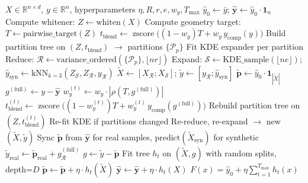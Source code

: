 \documentclass[11pt,a4paper]{article}
\newcommand{\R}{\mathbb{R}}
\newcommand{\zscore}{\operatorname{zscore}}
\theoremstyle{definition}
\begin{document}
\begin{algorithm}[H]
\caption{GeoXGB Fit (Regression, Squared Error)}
\begin{algorithmic}[1]
\REQUIRE $X \in \R^{n \times d}$, $y \in \R^n$, hyperparameters $\eta, R, r, e, w_y, T_{\max}$
\STATE $\hat{y}_0 \gets \bar{y}$; \quad $\hat{\bm{y}} \gets \hat{y}_0 \cdot \bm{1}_n$
\STATE Compute whitener: $Z \gets \text{whiten}(X)$
\STATE Compute geometry target: $T \gets \text{pairwise\_target}(Z)$
\STATE $t_{\text{blend}} \gets \zscore\bigl((1-w_y) T + w_y\, y_{\text{comp}}(y)\bigr)$
\STATE Build partition tree on $(Z, t_{\text{blend}})$ $\to$ partitions $\{\mathcal{P}_p\}$
\STATE Fit KDE expander per partition
\STATE Reduce: $\mathcal{R} \gets \text{variance\_ordered}(\{\mathcal{P}_p\}, \lfloor n r \rfloor)$
\STATE Expand: $\mathcal{S} \gets \text{KDE\_sample}(\lfloor n e \rfloor)$; \quad $\hat{y}_{\text{syn}} \gets \text{kNN}_{k=3}(Z_\mathcal{S}, Z_\mathcal{R}, y_\mathcal{R})$
\STATE $\tilde{X} \gets [X_\mathcal{R}; X_\mathcal{S}]$; \quad $\tilde{y} \gets [y_\mathcal{R}; \hat{y}_{\text{syn}}]$
\STATE $\tilde{\bm{p}} \gets \hat{y}_0 \cdot \bm{1}_{|\tilde{X}|}$
        \STATE $g^{(\text{full})} \gets y - \hat{\bm{y}}$ \hfill{}
        \STATE $w_y^{(t)} \gets w_y \cdot |\rho(T, g^{(\text{full})})|$ \hfill{}
        \STATE $t_{\text{blend}}^{(t)} \gets \zscore\bigl((1-w_y^{(t)}) T + w_y^{(t)}\, y_{\text{comp}}(g^{(\text{full})})\bigr)$
        \STATE Rebuild partition tree on $(Z, t_{\text{blend}}^{(t)})$ \hfill{}
        \STATE Re-fit KDE if partitions changed
        \STATE Re-reduce, re-expand $\to$ new $(\tilde{X}, \tilde{y})$
        \STATE Sync $\tilde{\bm{p}}$ from $\hat{\bm{y}}$ for real samples, $\text{predict}(\tilde{X}_{\text{syn}})$ for synthetic
        \STATE $\tilde{y}_{\text{real}} \gets \tilde{\bm{p}}_{\text{real}} + g^{(\text{full})}_\mathcal{R}$ \hfill{}
    \ENDIF
    \STATE $g \gets \tilde{y} - \tilde{\bm{p}}$ \hfill{}
    \STATE Fit tree $h_t$ on $(\tilde{X}, g)$ with random splits, depth=$D$
    \STATE $\tilde{\bm{p}} \gets \tilde{\bm{p}} + \eta \cdot h_t(\tilde{X})$
    \STATE $\hat{\bm{y}} \gets \hat{\bm{y}} + \eta \cdot h_t(X)$
\ENDFOR
\STATE $F(x) = \hat{y}_0 + \eta \sum_{t=1}^{T_{\max}} h_t(x)$ \hfill{}
\end{algorithmic}
\end{algorithm}
\end{document}

